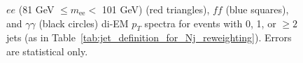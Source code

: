 \documentclass[dissertation.tex]{subfiles}
\begin{document}
\begin{figure}
	\caption{$ee$ (81 GeV $\leq m_{\mathrm{ee}} <$ 101 GeV) (red triangles), $\mathit{ff}$ (blue squares), and $\gamma\gamma$ (black circles) di-EM $p_{T}$ spectra for events with 0, 1, or $\geq 2$ jets (as in Table~\ref{tab:jet_definition_for_Nj_reweighting}).  Errors are statistical only.}
	\label{fig:dijet_pT}
\end{figure}

\begin{figure}
	\centering
	\hspace{1cm}
	\hspace{1cm}

\end{figure}
\end{document}
